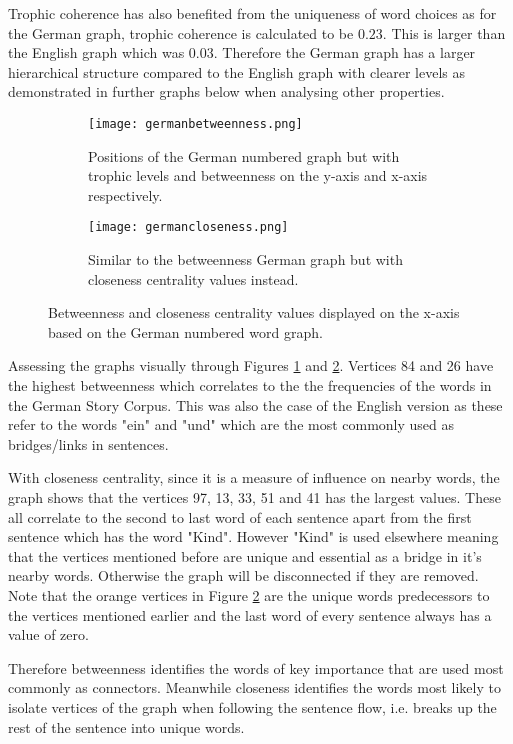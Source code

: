 Trophic coherence has also benefited from the uniqueness of word choices as for the German graph, trophic coherence is calculated to be $0.23$. This is larger than the English graph which was 0.03. Therefore the German graph has a larger hierarchical structure compared to the English graph with clearer levels as demonstrated in further graphs below when analysing other properties.

\begin{figure}[H]
\centering
\begin{subfigure}{.45\textwidth}
	\hspace{-1cm} 
	\texttt{[image: germanbetweenness.png]}
	\caption{Positions of the German numbered graph but with trophic levels and betweenness on the y-axis and x-axis respectively.}
	\label{fig:gerbc}
\end{subfigure}
\hfill
\begin{subfigure}{.45\textwidth}
	\hspace{-1cm} 
	\texttt{[image: germancloseness.png]}
	\caption{Similar to the betweenness German graph but with closeness centrality values instead. }
	\label{fig:gercc}
\end{subfigure}
\caption{Betweenness and closeness centrality values displayed on the x-axis based on the German numbered word graph.}
\label{fig:gercentrality}
\end{figure}

Assessing the graphs visually through Figures \ref{fig:gerbc} and \ref{fig:gercc}. Vertices 84 and 26 have the highest betweenness which correlates to the the frequencies of the words in the German Story Corpus. This was also the case of the English version as these refer to the words "ein" and "und" which are the most commonly used as bridges/links in sentences.

With closeness centrality, since it is a measure of influence on nearby words, the graph shows that the vertices 97, 13, 33, 51 and 41 has the largest values. These all correlate to the second to last word of each sentence apart from the first sentence which has the word "Kind". However "Kind" is used elsewhere meaning that the vertices mentioned before are unique and essential as a bridge in it's nearby words. Otherwise the graph will be disconnected if they are removed. Note that the orange vertices in Figure \ref{fig:gercc} are the unique words predecessors to the vertices mentioned earlier and the last word of every sentence always has a value of zero.

Therefore betweenness identifies the words of key importance that are used most commonly as connectors. Meanwhile closeness identifies the words most likely to isolate vertices of the graph when following the sentence flow, i.e. breaks up the rest of the sentence into unique words.

